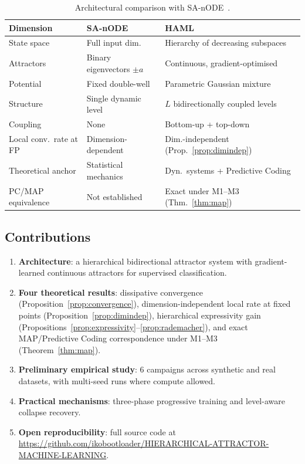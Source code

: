 \documentclass[11pt,a4paper]{article}
\begin{document}
\begin{table}[h]
\centering
\footnotesize
\setlength{\tabcolsep}{5pt}
\begin{tabular}{lll}
\toprule
\textbf{Dimension} & \textbf{SA-nODE} & \textbf{HAML} \\
\midrule
State space             & Full input dim.\               & Hierarchy of decreasing subspaces \\
Attractors              & Binary eigenvectors $\pm a$    & Continuous, gradient-optimised \\
Potential               & Fixed double-well              & Parametric Gaussian mixture \\
Structure               & Single dynamic level           & $L$ bidirectionally coupled levels \\
Coupling                & None                           & Bottom-up + top-down \\
Local conv.\ rate at FP & Dimension-dependent            & Dim.-independent (Prop.~\ref{prop:dimindep}) \\
Theoretical anchor      & Statistical mechanics          & Dyn.\ systems + Predictive Coding \\
PC/MAP equivalence      & Not established                & Exact under M1--M3 (Thm.~\ref{thm:map}) \\
\bottomrule
\end{tabular}
\caption{Architectural comparison with SA-nODE~\cite{marino2024}.}
\label{tab:comparison_sanode}
\end{table}

\subsection{Contributions}

\begin{enumerate}
  \item \textbf{Architecture}: a hierarchical bidirectional attractor system with
        gradient-learned continuous attractors for supervised classification.
  \item \textbf{Four theoretical results}: dissipative convergence (Proposition~\ref{prop:convergence}),
        dimension-independent local rate at fixed points (Proposition~\ref{prop:dimindep}),
        hierarchical expressivity gain (Propositions~\ref{prop:expressivity}--\ref{prop:rademacher}),
        and exact MAP/Predictive Coding correspondence under M1--M3 (Theorem~\ref{thm:map}).
  \item \textbf{Preliminary empirical study}: 6 campaigns across synthetic and real
        datasets, with multi-seed runs where compute allowed.
  \item \textbf{Practical mechanisms}: three-phase progressive training and level-aware
        collapse recovery.
  \item \textbf{Open reproducibility}: full source code at
        \url{https://github.com/ikobootloader/HIERARCHICAL-ATTRACTOR-MACHINE-LEARNING}.
\end{enumerate}
\end{document}
